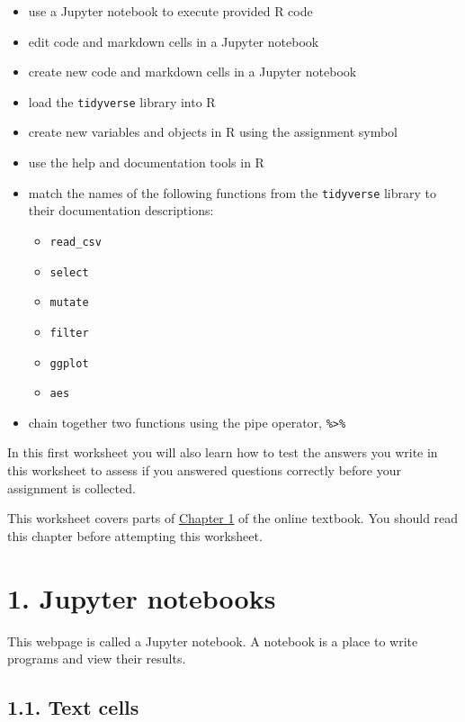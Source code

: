 \documentclass[11pt]{article}
\providecommand{\tightlist}{%
      \setlength{\itemsep}{0pt}\setlength{\parskip}{0pt}}
\begin{document}
\begin{itemize}
\tightlist
\item
  use a Jupyter notebook to execute provided R code
\item
  edit code and markdown cells in a Jupyter notebook
\item
  create new code and markdown cells in a Jupyter notebook
\item
  load the \texttt{tidyverse} library into R
\item
  create new variables and objects in R using the assignment symbol
\item
  use the help and documentation tools in R
\item
  match the names of the following functions from the \texttt{tidyverse}
  library to their documentation descriptions:

  \begin{itemize}
  \tightlist
  \item
    \texttt{read\_csv}
  \item
    \texttt{select}
  \item
    \texttt{mutate}
  \item
    \texttt{filter}
  \item
    \texttt{ggplot}
  \item
    \texttt{aes}
  \end{itemize}
\item
  chain together two functions using the pipe operator,
  \texttt{\%\textgreater{}\%}
\end{itemize}

In this first worksheet you will also learn how to test the answers you
write in this worksheet to assess if you answered questions correctly
before your assignment is collected.

This worksheet covers parts of
\href{https://ubc-dsci.github.io/introduction-to-data-science/chapter2.html}{Chapter
1} of the online textbook. You should read this chapter before
attempting this worksheet.

    \section{1. Jupyter notebooks}\label{jupyter-notebooks}

This webpage is called a Jupyter notebook. A notebook is a place to
write programs and view their results.

\subsection{1.1. Text cells}\label{text-cells}
\end{document}
